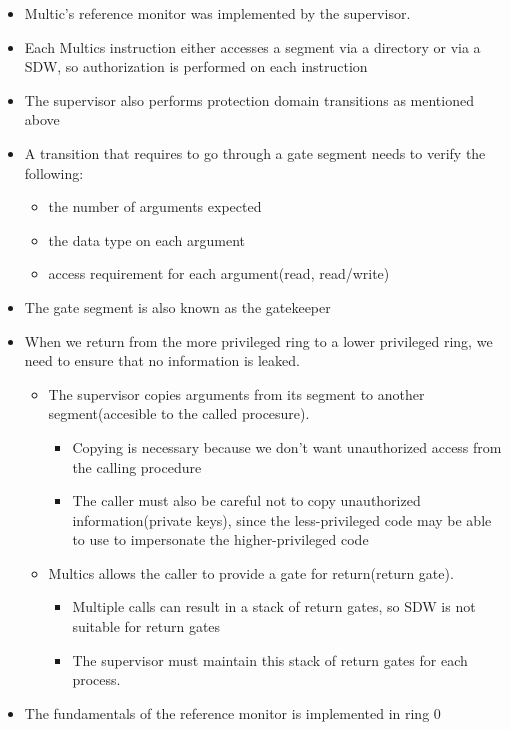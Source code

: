 \documentclass[
  12pt]{findlay}
\providecommand{\tightlist}{%
  \setlength{\itemsep}{0pt}\setlength{\parskip}{0pt}}
\begin{document}
\begin{itemize}
\tightlist
\item
  Multic's reference monitor was implemented by the supervisor.
\item
  Each Multics instruction either accesses a segment via a directory or
  via a SDW, so authorization is performed on each instruction
\item
  The supervisor also performs protection domain transitions as
  mentioned above
\item
  A transition that requires to go through a gate segment needs to
  verify the following:

  \begin{itemize}
  \tightlist
  \item
    the number of arguments expected
  \item
    the data type on each argument
  \item
    access requirement for each argument(read, read/write)
  \end{itemize}
\item
  The gate segment is also known as the gatekeeper
\item
  When we return from the more privileged ring to a lower privileged
  ring, we need to ensure that no information is leaked.

  \begin{itemize}
  \tightlist
  \item
    The supervisor copies arguments from its segment to another
    segment(accesible to the called procesure).

    \begin{itemize}
    \tightlist
    \item
      Copying is necessary because we don't want unauthorized access
      from the calling procedure
    \item
      The caller must also be careful not to copy unauthorized
      information(private keys), since the less-privileged code may be
      able to use to impersonate the higher-privileged code
    \end{itemize}
  \item
    Multics allows the caller to provide a gate for return(return gate).

    \begin{itemize}
    \tightlist
    \item
      Multiple calls can result in a stack of return gates, so SDW is
      not suitable for return gates
    \item
      The supervisor must maintain this stack of return gates for each
      process.
    \end{itemize}
  \end{itemize}
\item
  The fundamentals of the reference monitor is implemented in ring 0


\end{itemize}
\end{document}
